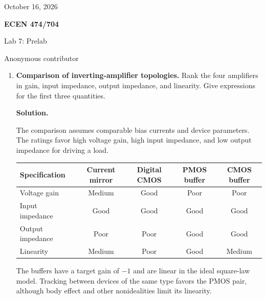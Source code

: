 \documentclass[12pt,letterpaper]{article}
\begin{document}
{\fontsize{11}{12.65}\selectfont
\hfill October 16, 2026\par}
{\centering
{\fontsize{14}{16.1}\selectfont\sffamily\bfseries ECEN 474/704\par}
{\fontsize{14}{16.1}\selectfont Lab 7: Prelab\par}
{\fontsize{14}{16.1}\selectfont Anonymous contributor\par}
}
\vspace{12pt}
\begin{enumerate}

\item \textbf{Comparison of inverting-amplifier topologies.}
Rank the four amplifiers in gain, input impedance, output impedance,
and linearity. Give expressions for the first three quantities.

\textbf{Solution.}

The comparison assumes comparable bias currents and device parameters.
The ratings favor high voltage gain, high input impedance, and low
output impedance for driving a load.

\begin{center}
\small
\setlength{\tabcolsep}{5pt}
\begin{tabular}{@{}lcccc@{}}
\toprule
Specification & Current mirror & Digital CMOS & PMOS buffer & CMOS buffer\\
\midrule
Voltage gain & Medium & Good & Poor & Poor\\
Input impedance & Good & Good & Good & Good\\
Output impedance & Poor & Poor & Good & Good\\
Linearity & Medium & Poor & Good & Medium\\
\bottomrule
\end{tabular}
\end{center}

The buffers have a target gain of $-1$ and are linear in the ideal
square-law model. Tracking between devices of the same type favors
the PMOS pair, although body effect and other nonidealities limit
its linearity.


\end{enumerate}
\end{document}
